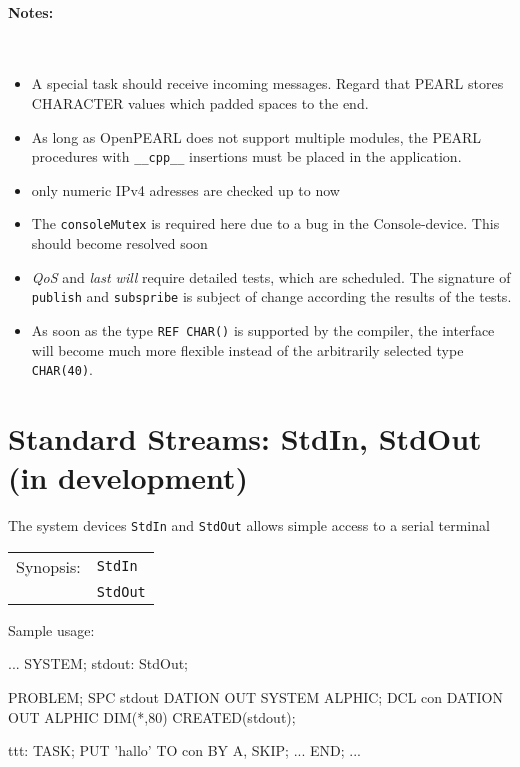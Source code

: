 \paragraph{Notes:}\ 
\begin{itemize}
\item A special task should receive incoming messages.
   Regard that PEARL stores CHARACTER values which padded spaces to the end.
\item As long as OpenPEARL does not support multiple modules,
  the PEARL procedures with \texttt{\_\_cpp\_\_} insertions must be 
  placed in the application.
\item only numeric IPv4 adresses are checked up to now
\item The \texttt{consoleMutex} is required here due to a bug in 
    the Console-device. This should become resolved soon 
\item \textit{QoS} and \textit{last will} require detailed tests,
 which are scheduled.
 The signature of \texttt{publish} and \texttt{subspribe} 
is subject of change according the results of the tests.
\item As soon as the type \texttt{REF CHAR()} is supported by the compiler,
the interface will become much more flexible instead of the arbitrarily 
selected type \texttt{CHAR(40)}. 
\end{itemize}



\section{Standard Streams: StdIn, StdOut (in development)}
The system devices \verb|StdIn| and \verb|StdOut| allows simple 
access to a serial terminal

\begin{tabular}{ll}
Synopsis: & \verb|StdIn| \\
          & \verb|StdOut| \\
  
\end{tabular}

Sample usage:
\begin{PEARLCode}
...
SYSTEM;
  stdout: StdOut;

PROBLEM;
   SPC stdout DATION OUT SYSTEM ALPHIC;
   DCL con    DATION OUT ALPHIC DIM(*,80) CREATED(stdout);

ttt: TASK;
   PUT 'hallo' TO con BY A, SKIP;
...
END;
...
\end{PEARLCode}

